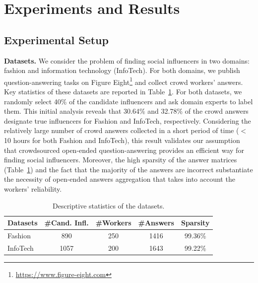 \section{Experiments and Results}
\label{sec:result}

\subsection{Experimental Setup}

\noindent\textbf{Datasets.} We consider the problem of finding social influencers in two domains: fashion and information technology (InfoTech). For both domains, we publish question-answering tasks on Figure Eight\footnote{\url{https://www.figure-eight.com}} and collect crowd workers' answers. Key statistics of these datasets are reported in Table~\ref{tab:datasets}. For both datasets, we randomly select 40\% of the candidate influencers and ask domain experts to label them. This initial analysis reveals that 30.64\% and 32.78\%  of the crowd answers designate true influencers for Fashion and InfoTech, respectively. Considering the relatively large number of crowd answers collected in a short period of time ($<$10 hours for both Fashion and InfoTech), this result validates our assumption that crowdsourced open-ended question-answering provides an efficient way  for finding social influencers. Moreover, the high sparsity of the answer matrices (Table~\ref{tab:datasets}) and the fact that the majority of the answers are incorrect substantiate the necessity of open-ended answers aggregation that takes into account the workers' reliability.

\begin{table}[!ht]
\centering \caption{Descriptive statistics of the
datasets.}\label{tab:datasets}
\addtolength{\tabcolsep}{-1mm}
\begin{tabular}{lcccc}
\toprule
    Datasets & \textbf{\#Cand. Infl.} & \textbf{\#Workers} & \textbf{\#Answers} & \textbf{Sparsity}   \\\midrule
    Fashion & 890 & 250 & 1416  & 99.36\% \\
    InfoTech & 1057 & 200 &1643 & 99.22\% \\
\bottomrule
\end{tabular}
\end{table}


